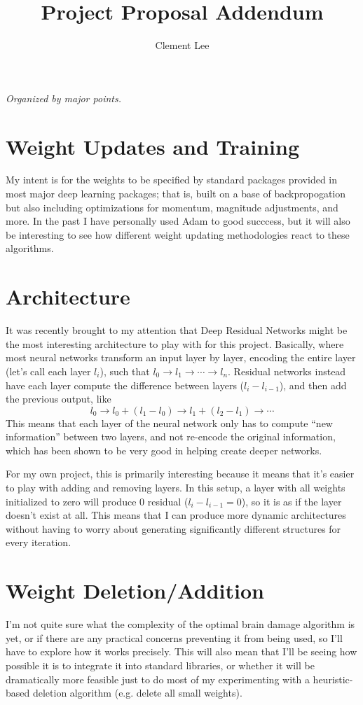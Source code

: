 \documentclass[11pt]{article}
\title{Project Proposal Addendum}
\author{Clement Lee}
\begin{document}
\maketitle

\noindent\emph{Organized by major points.}

\section{Weight Updates and Training}
My intent is for the weights to be specified by standard packages provided in most major deep learning packages; that is, built on a base of backpropogation but also including optimizations for momentum, magnitude adjustments, and more.
In the past I have personally used Adam \cite{kingma2014adam} to good succcess, but it will also be interesting to see how different weight updating methodologies react to these algorithms.

\section{Architecture}
It was recently brought to my attention that Deep Residual Networks \cite{he2015deep} might be the most interesting architecture to play with for this project.
Basically, where most neural networks transform an input layer by layer, encoding the entire layer (let's call each layer $l_i$), such that $l_0 \to l_1 \to \cdots \to l_n$.
Residual networks instead have each layer compute the difference between layers ($l_i - l_{i-1}$), and then add the previous output, like
\[l_0 \to l_0 + (l_1 - l_0) \to l_1 + (l_2 - l_1)\to \cdots\]
This means that each layer of the neural network only has to compute ``new information'' between two layers, and not re-encode the original information, which has been shown to be very good in helping create deeper networks.

For my own project, this is primarily interesting because it means that it's easier to play with adding and removing layers.
In this setup, a layer with all weights initialized to zero will produce 0 residual ($l_i - l_{i-1} = 0$), so it is as if the layer doesn't exist at all.
This means that I can produce more dynamic architectures without having to worry about generating significantly different structures for every iteration.

\section{Weight Deletion/Addition}
I'm not quite sure what the complexity of the optimal brain damage algorithm is yet, or if there are any practical concerns preventing it from being used, so I'll have to explore how it works precisely.
This will also mean that I'll be seeing how possible it is to integrate it into standard libraries, or whether it will be dramatically more feasible just to do most of my experimenting with a heuristic-based deletion algorithm (e.g. delete all small weights).
\end{document}
